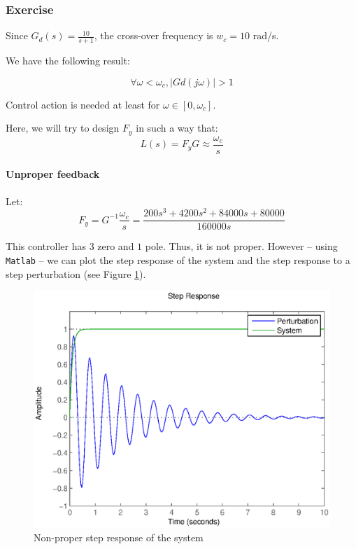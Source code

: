 \subsubsection{Exercise}

Since $G_d(s) = \frac{10}{s+1}$, the cross-over frequency is $w_c = 10$ rad/s.

We have the following result:

$$\forall \omega < \omega_c, |Gd(j\omega)| >1$$

Control action is needed at least for $\omega \in [0,\omega_c]$.

Here, we will try to design $F_y$ in such a way that:
$$L(s) = F_y G \approx \frac{\omega_c}{s}$$

\paragraph{Unproper feedback}
Let:
$$F_y = G^{-1} \frac{\omega_c}{s} = \frac{200 s^3 + 4200 s^2 + 84000 s + 80000}{160000 s}$$

This controller has $3$ zero and $1$ pole.
Thus, it is not proper.
However -- using \texttt{Matlab} -- we can plot the step response of the system and the step response to a step perturbation (see Figure \ref{stepNonProper}).

\begin{figure}[h!t]
    \centering
    \includegraphics[width=\linewidth]{fig/stepNonProper421.eps}
    \caption{Non-proper step response of the system}
    \label{stepNonProper}
\end{figure}

